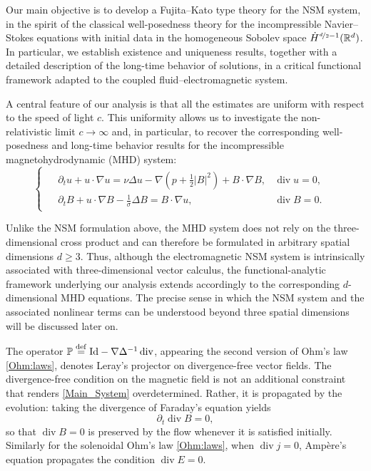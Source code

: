 \documentclass[11pt, leqno, a4paper,]{amsart}
\theoremstyle{remark}
\numberwithin{equation}{section}
\newcommand*{\bydef}{\overset{\rm def}{=}}
\renewcommand*{\div}{\operatorname{div}}
\begin{document}
Our main objective is to develop a Fujita--Kato type theory for the NSM system, in the spirit of the classical well-posedness theory for the incompressible Navier--Stokes equations with initial data in the   homogeneous Sobolev space $\dot H^{\nicefrac{d}{2}-1} (\mathbb R^d)$. In particular, we establish existence and uniqueness results, together with a detailed description of the long-time behavior of solutions, in a critical functional framework adapted to the coupled fluid--electromagnetic system.

A central feature of our analysis is that all the estimates are uniform with respect to the speed of light $c$. This uniformity allows us to investigate the non-relativistic limit $c\to \infty$ and, in particular, to recover the corresponding well-posedness and long-time behavior results for the incompressible magnetohydrodynamic (MHD) system:
\begin{equation}\label{MHD} 
	\begin{cases}
		\begin{aligned}
			 &\partial_t u +u \cdot\nabla u   = \nu \Delta u- \nabla \left( p + \frac{1}{2} |B|^2\right) + B \cdot \nabla  B, &\div u =0,& 
			 \\
			 &  \partial_t B + u \cdot \nabla  B - \frac{1}{\sigma}\Delta B = B \cdot \nabla  u , &\div B =0.   & 
		\end{aligned}
	\end{cases}\tag{MHD}
\end{equation}

 Unlike the NSM formulation above, the MHD system does not rely on the three-dimensional cross product and can therefore be formulated in arbitrary spatial dimensions $d\geq 3$. Thus, although the electromagnetic NSM system is intrinsically associated with three-dimensional vector calculus, the functional-analytic framework underlying our analysis extends accordingly to the corresponding $d$-dimensional MHD equations. The precise sense in which the NSM system and the associated nonlinear terms can be understood beyond three spatial dimensions will be discussed later on.

The operator 
  $\mathbb P \bydef \text{Id} - \nabla \Delta^{-1} \div $, appearing the second version of Ohm's law \eqref{Ohm:laws}, denotes   Leray's projector on divergence-free vector fields. The divergence-free condition on the magnetic field is not an additional constraint that renders \eqref{Main_System} overdetermined. Rather, it is propagated by the evolution: taking the divergence of Faraday's equation  yields
\begin{equation*}
	\partial_t \div B=0,
\end{equation*}
so that $\div B=0$ is preserved by the flow whenever it is satisfied initially. Similarly for the solenoidal Ohm's law \eqref{Ohm:laws}, when $\div j=0$, Amp\`ere's equation propagates the condition $\div E=0$.
\end{document}
